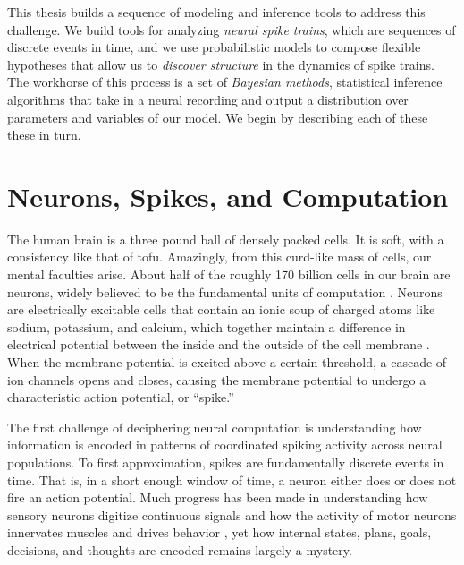 This thesis builds a sequence of modeling and inference tools to
address this challenge. We build tools for analyzing \emph{neural spike
  trains}, which are sequences of discrete events in time, and we use
probabilistic models to compose flexible hypotheses that allow us to
\emph{discover structure} in the dynamics of spike trains.  The
workhorse of this process is a set of \emph{Bayesian methods},
statistical inference algorithms that take in a neural recording and
output a distribution over parameters and variables of our model.  We
begin by describing each of these these in turn.


\section{Neurons, Spikes, and Computation}
The human brain is a three pound ball of densely packed cells.  It is
soft, with a consistency like that of tofu.  Amazingly, from this
curd-like mass of cells, our mental faculties arise.  About half of
the roughly 170 billion cells in our brain are neurons, widely
believed to be the fundamental units of computation
\citep{DayanAbbott}.  Neurons are electrically excitable cells that
contain an ionic soup of charged atoms like sodium, potassium, and
calcium, which together maintain a difference in electrical potential
between the inside and the outside of the cell membrane
\citep{kandel2000principles}. When the membrane potential is excited
above a certain threshold, a cascade of ion channels opens and closes,
causing the membrane potential to undergo a characteristic action
potential, or ``spike.''

The first challenge of deciphering neural computation is understanding
how information is encoded in patterns of coordinated spiking activity
across neural populations. To first approximation, spikes are
fundamentally discrete events in time.  That is, in a short enough
window of time, a neuron either does or does not fire an action
potential.  Much progress has been made in understanding how sensory
neurons digitize continuous signals and how the activity of motor
neurons innervates muscles and drives behavior \citep{rieke1999spikes}, yet how internal
states, plans, goals, decisions, and thoughts are encoded remains
largely a mystery.


